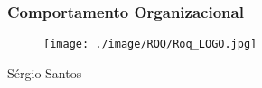 \begin{frame}
\frametitle{Comportamento Organizacional}
\begin{figure}[ht]
\begin{center}
\texttt{[image: ./image/ROQ/Roq\_LOGO.jpg]}
\end{center}
\end{figure}\par
\hfill {\tiny Sérgio Santos}
\end{frame}
